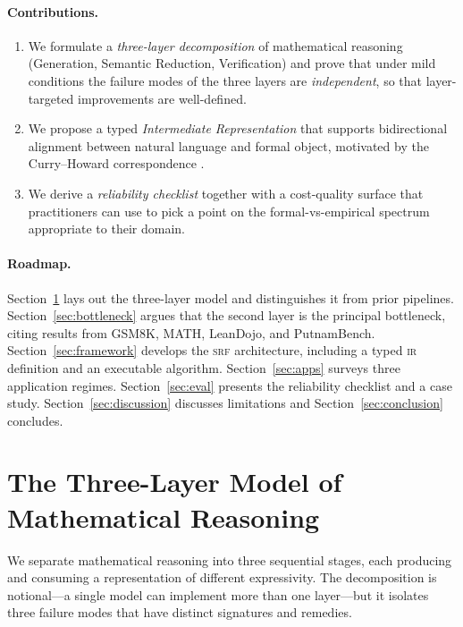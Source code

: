 \documentclass[11pt,a4paper]{article}
\newcommand{\IR}{\textsc{ir}}
\newcommand{\IRpipeline}{\textsc{srf}}
\begin{document}
\paragraph{Contributions.}
\begin{enumerate}\itemsep2pt
  \item We formulate a \emph{three-layer decomposition} of
        mathematical reasoning (Generation, Semantic Reduction,
        Verification) and prove that under mild conditions the
        failure modes of the three layers are \emph{independent},
        so that layer-targeted improvements are well-defined.
  \item We propose a typed \emph{Intermediate Representation} that
        supports bidirectional alignment between natural language
        and formal object, motivated by the Curry--Howard
        correspondence \citep{howard1980formulastypes}.
  \item We derive a \emph{reliability checklist} together with a
        cost-quality surface that practitioners can use to pick a
        point on the formal-vs-empirical spectrum appropriate to
        their domain.
\end{enumerate}

\paragraph{Roadmap.}
Section~\ref{sec:model} lays out the three-layer model and
distinguishes it from prior pipelines.  Section~\ref{sec:bottleneck}
argues that the second layer is the principal bottleneck, citing
results from GSM8K, MATH, LeanDojo, and PutnamBench.
Section~\ref{sec:framework} develops the \IRpipeline{} architecture,
including a typed \IR{} definition and an executable algorithm.
Section~\ref{sec:apps} surveys three application regimes.
Section~\ref{sec:eval} presents the reliability checklist and a case
study.  Section~\ref{sec:discussion} discusses limitations and
Section~\ref{sec:conclusion} concludes.

\section{The Three-Layer Model of Mathematical Reasoning}
\label{sec:model}

We separate mathematical reasoning into three sequential stages, each
producing and consuming a representation of different expressivity.
The decomposition is notional---a single model can implement more
than one layer---but it isolates three failure modes that have
distinct signatures and remedies.
\end{document}
